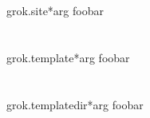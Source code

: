     \section{}

        \begin{funcdesc}{grok.site}{*arg}
        foobar
        \end{funcdesc}

    \section{}

        \begin{funcdesc}{grok.template}{*arg}
        foobar
        \end{funcdesc}

    \section{}

        \begin{funcdesc}{grok.templatedir}{*arg}
        foobar
        \end{funcdesc}
